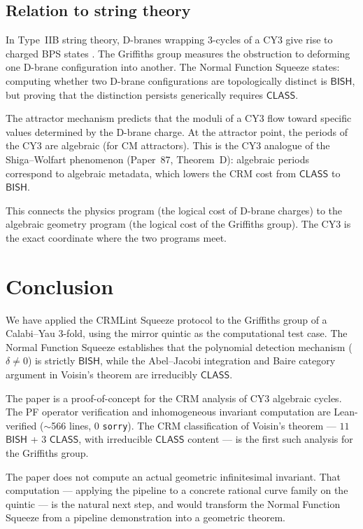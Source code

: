 \documentclass[11pt]{article}
\theoremstyle{plain}
\theoremstyle{definition}
\theoremstyle{remark}
\newcommand{\BISH}{\ensuremath{\mathsf{BISH}}}
\newcommand{\CLASS}{\ensuremath{\mathsf{CLASS}}}
\begin{document}
\subsection{Relation to string theory}

In Type~IIB string theory, D-branes wrapping $3$-cycles of a CY3 give rise to charged BPS states \cite{denef-douglas}. The Griffiths group measures the obstruction to deforming one D-brane configuration into another. The Normal Function Squeeze states: computing whether two D-brane configurations are topologically distinct is $\BISH$, but proving that the distinction persists generically requires $\CLASS$.

The attractor mechanism \cite{moore-attractor} predicts that the moduli of a CY3 flow toward specific values determined by the D-brane charge. At the attractor point, the periods of the CY3 are algebraic (for CM attractors). This is the CY3 analogue of the Shiga--Wolfart phenomenon (Paper~87, Theorem~D): algebraic periods correspond to algebraic metadata, which lowers the CRM cost from $\CLASS$ to $\BISH$.

This connects the physics program (the logical cost of D-brane charges) to the algebraic geometry program (the logical cost of the Griffiths group). The CY3 is the exact coordinate where the two programs meet.


\section{Conclusion}
\label{sec:conclusion}

We have applied the CRMLint Squeeze protocol to the Griffiths group of a Calabi--Yau 3-fold, using the mirror quintic as the computational test case. The Normal Function Squeeze establishes that the polynomial detection mechanism ($\delta \neq 0$) is strictly $\BISH$, while the Abel--Jacobi integration and Baire category argument in Voisin's theorem are irreducibly $\CLASS$.

The paper is a proof-of-concept for the CRM analysis of CY3 algebraic cycles. The PF operator verification and inhomogeneous invariant computation are Lean-verified ($\sim$566 lines, 0 \texttt{sorry}). The CRM classification of Voisin's theorem --- $11$ $\BISH$ + $3$ $\CLASS$, with irreducible $\CLASS$ content --- is the first such analysis for the Griffiths group.

The paper does not compute an actual geometric infinitesimal invariant. That computation --- applying the pipeline to a concrete rational curve family on the quintic --- is the natural next step, and would transform the Normal Function Squeeze from a pipeline demonstration into a geometric theorem.
\end{document}
